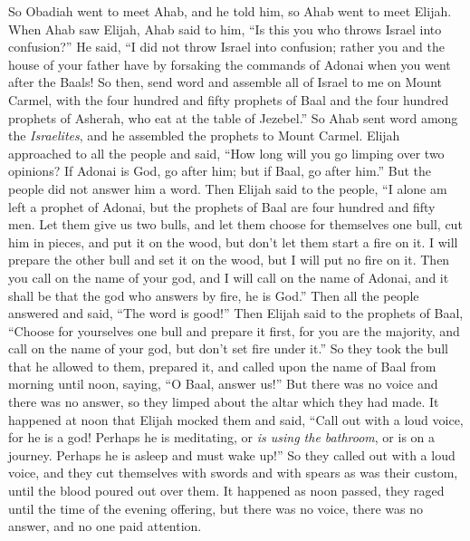 \begin{biblechapter}
\verse So Obadiah went to meet Ahab, and he told him, so Ahab went to meet Elijah.
\verse When Ahab saw Elijah, Ahab said to him, “Is this you who throws Israel into confusion?”
\verse He said, “I did not throw Israel into confusion; rather you and the house of your father have by forsaking the commands of Adonai when you went after the Baals!
\verse So then, send word and assemble all of Israel to me on Mount Carmel, with the four hundred and fifty prophets of Baal and the four hundred prophets of Asherah, who eat at the table of Jezebel.”
\verse So Ahab sent word among the \textit{Israelites}, and he assembled the prophets to Mount Carmel.
\verse Elijah approached to all the people and said, “How long will you go limping over two opinions? If Adonai is God, go after him; but if Baal, go after him.” But the people did not answer him a word.
\verse Then Elijah said to the people, “I alone am left a prophet of Adonai, but the prophets of Baal are four hundred and fifty men.
\verse Let them give us two bulls, and let them choose for themselves one bull, cut him in pieces, and put it on the wood, but don’t let them start a fire on it. I will prepare the other bull and set it on the wood, but I will put no fire on it.
\verse Then you call on the name of your god, and I will call on the name of Adonai, and it shall be that the god who answers by fire, he is God.” Then all the people answered and said, “The word is good!”
\verse Then Elijah said to the prophets of Baal, “Choose for yourselves one bull and prepare it first, for you are the majority, and call on the name of your god, but don’t set fire under it.”
\verse So they took the bull that he allowed to them, prepared it, and called upon the name of Baal from morning until noon, saying, “O Baal, answer us!” But there was no voice and there was no answer, so they limped about the altar which they had made.
\verse It happened at noon that Elijah mocked them and said, “Call out with a loud voice, for he is a god! Perhaps he is meditating, or \textit{is using the bathroom}, or is on a journey. Perhaps he is asleep and must wake up!”
\verse So they called out with a loud voice, and they cut themselves with swords and with spears as was their custom, until the blood poured out over them.
\verse It happened as noon passed, they raged until the time of the evening offering, but there was no voice, there was no answer, and no one paid attention.

\end{biblechapter}
